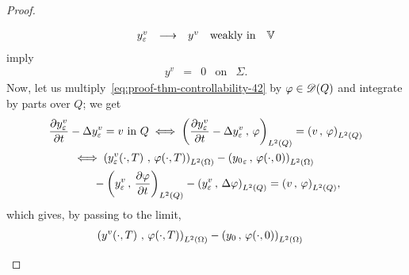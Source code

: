 \begin{proof}
\begin{enumerate}
\begin{equation*}
                \begin{array}{rclll}
                    y_{\varepsilon}^{v} & \longrightarrow & y^{v} & \text{weakly
                    in} & \mathbb{V}
                \end{array}
            \end{equation*}
            imply
            \begin{equation}\label{eq:proof-thm-controllability-47}
                \begin{array}{rclll}
                    y^{v} & = & 0 & \text{on} & \Sigma.
                \end{array}
            \end{equation}
            Now, let us multiply~\eqref{eq:proof-thm-controllability-42} by
            $\varphi\in \mathscr{D}(Q)$ and integrate by parts over $Q$; we get
            \begin{equation*}
                \begin{split}
                    {} & \primetemps{y_{\veps}^{v}} - \Delta y_{\veps}^{v}
                    = v\ \text{in}\ Q \iff \scalaireq{%
                        \primetemps{y_{\veps}^{v}} - \Delta y_{\veps}^{v}
                    }{\vphi} = \scalaireq{v}{\vphi}\\
                    &\qquad\iff \scalaireohm{%
                        \condfinale{y_{\veps}^{v}}
                    }{%
                        \condfinale{\vphi}
                    } - \scalaireohm{%
                        {y_{0}}_{\veps}
                    }{%
                        \condinitiale{\vphi}
                    }\\
                    &\qquad\qquad - \scalaireq{%
                        y_{\veps}^{v}
                    }{%
                        \primetemps{\vphi}
                    } - \scalaireq{%
                        y_{\veps}^{v}
                    }{%
                        \Delta\vphi{}
                    } = \scalaireq{v}{\vphi},
                \end{split}
            \end{equation*}
            which gives, by passing to the limit,
            \begin{equation*}
                \begin{split}
                    {} & \scalaireohm{%
                        \condfinale{y^{v}}
                    }{%
                        \condfinale{\vphi}
                    } - \scalaireohm{%
                        y_{0}
                    }{%
                        \condinitiale{\vphi}
}
\end{split}
\end{equation*}
\end{enumerate}
\end{proof}
